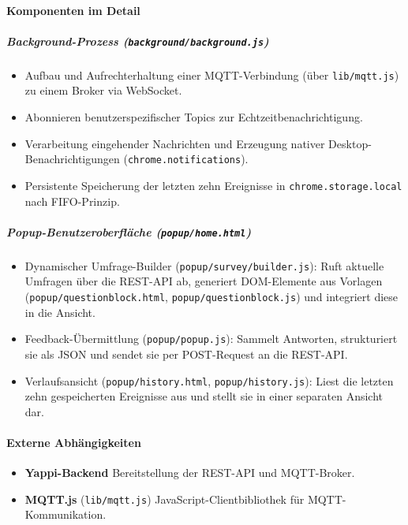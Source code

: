 \documentclass[12pt,a4paper]{report}
\begin{document}
\paragraph{Komponenten im Detail}
    \subparagraph{Background-Prozess (\texttt{background/background.js})}
        \begin{itemize}
          \item Aufbau und Aufrechterhaltung einer MQTT-Verbindung (über \texttt{lib/mqtt.js}) zu einem Broker via WebSocket.
          \item Abonnieren benutzerspezifischer Topics zur Echtzeitbenachrichtigung.
          \item Verarbeitung eingehender Nachrichten und Erzeugung nativer Desktop-Benachrichtigungen (\texttt{chrome.notifications}).
          \item Persistente Speicherung der letzten zehn Ereignisse in \texttt{chrome.storage.local} nach FIFO-Prinzip.
        \end{itemize}


    \subparagraph{Popup-Benutzeroberfläche (\texttt{popup/home.html})}
        \begin{itemize}
          \item Dynamischer Umfrage-Builder (\texttt{popup/survey/builder.js}):
                Ruft aktuelle Umfragen über die REST-API ab, generiert DOM-Elemente aus Vorlagen (\texttt{popup/questionblock.html},
                \texttt{popup/questionblock.js}) und integriert diese in die Ansicht.
          \item Feedback-Übermittlung (\texttt{popup/popup.js}):
                Sammelt Antworten, strukturiert sie als JSON und sendet sie per POST-Request an die REST-API.
          \item Verlaufsansicht (\texttt{popup/history.html}, \texttt{popup/history.js}):
                Liest die letzten zehn gespeicherten Ereignisse aus und stellt sie in einer separaten Ansicht dar.
        \end{itemize}

\paragraph{Externe Abhängigkeiten}
    \begin{itemize}
      \item \textbf{Yappi-Backend} Bereitstellung der REST-API und MQTT-Broker.
      \item \textbf{MQTT.js} (\texttt{lib/mqtt.js}) JavaScript-Clientbibliothek für MQTT-Kommunikation.
    \end{itemize}
\end{document}
